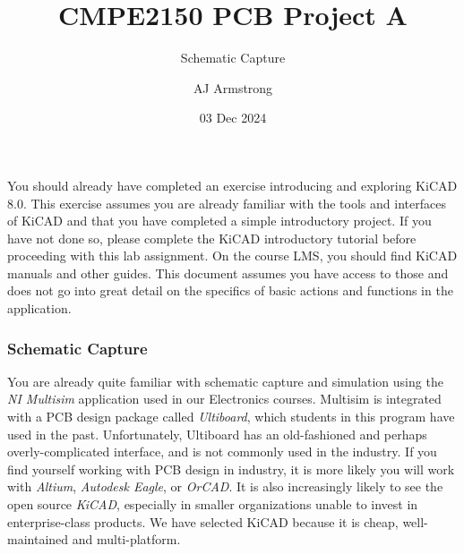 \documentclass[
  letterpaper,
  DIV=11,
  numbers=noendperiod,
  oneside]{scrartcl}
\title{CMPE2150 PCB Project A}
\subtitle{Schematic Capture}
\author{AJ Armstrong}
\date{03 Dec 2024}
\renewcommand*\contentsname{Table of contents}
\newcommand\contentsname{Table of contents}
\begin{document}
\maketitle

\renewcommand*\contentsname{Table of contents}
{
\hypersetup{linkcolor=}
\setcounter{tocdepth}{3}
\tableofcontents
}

\begin{tcolorbox}[enhanced jigsaw, arc=.35mm, opacitybacktitle=0.6, titlerule=0mm, title=\textcolor{quarto-callout-important-color}{\faExclamation}\hspace{0.5em}{Important}, coltitle=black, colframe=quarto-callout-important-color-frame, rightrule=.15mm, colback=white, bottomtitle=1mm, toprule=.15mm, bottomrule=.15mm, colbacktitle=quarto-callout-important-color!10!white, leftrule=.75mm, breakable, left=2mm, opacityback=0, toptitle=1mm]

You should already have completed an exercise introducing and exploring
KiCAD 8.0. This exercise assumes you are already familiar with the tools
and interfaces of KiCAD and that you have completed a simple
introductory project. If you have not done so, please complete the KiCAD
introductory tutorial before proceeding with this lab assignment. On the
course LMS, you should find KiCAD manuals and other guides. This
document assumes you have access to those and does not go into great
detail on the specifics of basic actions and functions in the
application.

\end{tcolorbox}

\subsubsection{Schematic Capture}\label{schematic-capture}

You are already quite familiar with schematic capture and simulation
using the \emph{NI Multisim} application used in our Electronics
courses. Multisim is integrated with a PCB design package called
\emph{Ultiboard}, which students in this program have used in the past.
Unfortunately, Ultiboard has an old-fashioned and perhaps
overly-complicated interface, and is not commonly used in the industry.
If you find yourself working with PCB design in industry, it is more
likely you will work with \emph{Altium}, \emph{Autodesk Eagle}, or
\emph{OrCAD}. It is also increasingly likely to see the open source
\emph{KiCAD}, especially in smaller organizations unable to invest in
enterprise-class products. We have selected KiCAD because it is cheap,
well-maintained and multi-platform.
\end{document}
